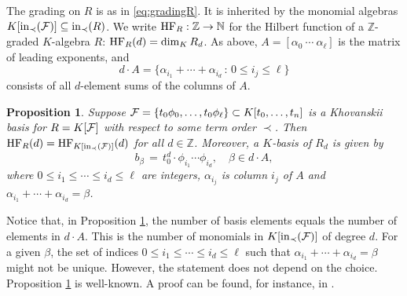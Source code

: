 \documentclass[12pt]{article}
\newtheorem{prop}[thm]{Proposition}
\theoremstyle{definition}
\theoremstyle{remark}
\begin{document}
The grading on $R$ is as in \eqref{eq:gradingR}. It is inherited by the monomial algebras $K[{\rm in}_\prec({\cal F})] \subseteq {\rm in}_\prec(R)$. We write ${\rm HF}_R : \mathbb{Z} \rightarrow \mathbb{N}$ for the Hilbert function of a $\mathbb{Z}$-graded $K$-algebra $R$: ${\rm HF}_R(d) = \dim_K R_d$. As above, $A = [\alpha_0~ \cdots ~\alpha_\ell]$ is the matrix of leading exponents, and 
\[ d \cdot A = \{ \alpha_{i_1} + \cdots + \alpha_{i_d} \, : \, 0 \leq i_j \leq \ell \} \]
consists of all $d$-element sums of the columns of $A$.

\begin{prop} \label{prop:basisforRd}
Suppose ${\cal F} = \{ t_0 \phi_0, \ldots, t_0 \phi_\ell \} \subset K[t_0, \ldots, t_n]$ is a Khovanskii basis for $R = K[{\cal F}]$ with respect to some term order $\prec$.
Then ${\rm HF}_{R}(d) = {\rm HF}_{K[{\rm in}_\prec({\cal F})]}(d)$ for all $d \in \mathbb{Z}$. Moreover, a $K$-basis of $R_d$ is given by
\begin{equation} \label{eq:bdbeta}
b_{\beta} \, = \, t_0^d \cdot \phi_{i_1}\cdots \phi_{i_d}, \quad \beta \in d \cdot A, 
\end{equation}
where $0 \leq i_1 \leq \cdots \leq i_d \leq \ell$ are integers, $\alpha_{i_j}$ is column $i_j$ of $A$ and $\alpha_{i_1} + \cdots + {\alpha_{i_d}} = \beta$.
\end{prop}

Notice that, in Proposition \ref{prop:basisforRd}, the number of basis elements equals the number of elements in $d \cdot A$. This is the number of monomials in $K[{\rm in}_\prec({\cal F})]$ of degree $d$. For a given $\beta$, the set of indices $0 \leq i_1 \leq \cdots \leq i_d \leq \ell$ such that $\alpha_{i_1} + \cdots + \alpha_{i_d} = \beta$ might not be unique. However, the statement does not depend on the choice. Proposition \ref{prop:basisforRd} is well-known. A proof can be found, for instance, in \cite[Proposition 4.3]{breiding2022algebraic}.
\end{document}
